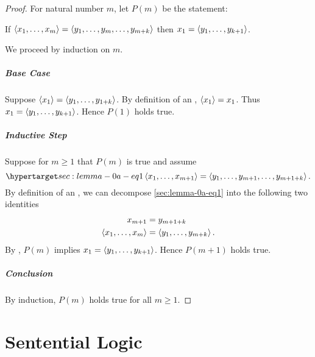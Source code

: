 \documentclass{report}
\begin{document}
  \begin{proof}

    For natural number $m$, let $P(m)$ be the statement:
      \begin{induction}
        If $\left< x_1, \ldots, x_m \right> = \left< y_1, \ldots, y_m, \ldots, y_{m+k} \right>$
          then $x_1 = \left< y_1, \ldots, y_{k+1} \right>$.
      \end{induction}
    \noindent
    We proceed by induction on $m$.

    \paragraph{Base Case}%

      Suppose $\left< x_1 \right> = \left< y_1, \ldots, y_{1 + k} \right>$.
      By definition of an , $\left< x_1 \right> = x_1$.
      Thus $x_1 = \left< y_1, \ldots, y_{k + 1} \right>$.
      Hence $P(1)$ holds true.

    \paragraph{Inductive Step}%

      Suppose for $m \geq 1$ that $P(m)$ is true and assume
        \begin{equation}
          \hyperlabel{sec:lemma-0a-eq1}
          \ltuple{x_1}{x_{m+1}} = \ltuple{y_1, \ldots, y_{m+1}}{y_{m+1+k}}.
        \end{equation}
      By definition of an , we can decompose
        \eqref{sec:lemma-0a-eq1} into the following two identities
        \begin{align*}
          x_{m+1} & = y_{m+1+k} \\
          \left< x_1, \ldots, x_m \right> & = \left< y_1, \ldots, y_{m+k} \right>.
        \end{align*}
      By , $P(m)$ implies $x_1 = \left< y_1, \ldots, y_{k+1} \right>$.
      Hence $P(m+1)$ holds true.

    \paragraph{Conclusion}%

      By induction, $P(m)$ holds true for all $m \geq 1$.

  \end{proof}

\chapter{Sentential Logic}%
\end{document}
